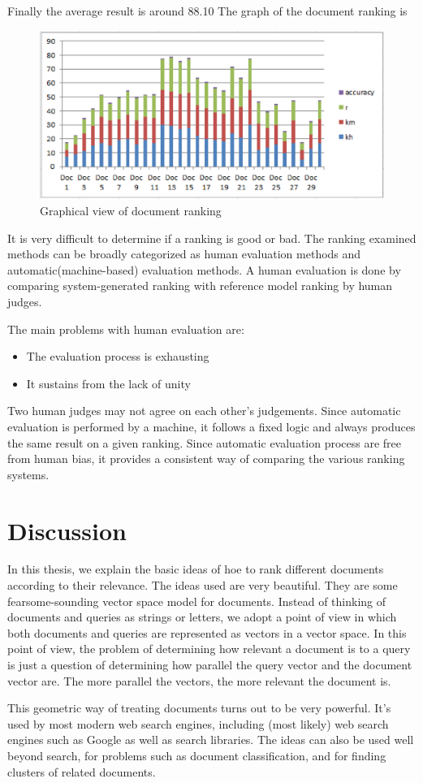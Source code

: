 Finally the average result is around 88.10%
The graph of the document ranking is


\begin{figure}[htp]
	\centering
		\includegraphics[width=.65\textwidth]{figure/six.eps}
	\caption{Graphical view of document ranking}
	\label{Figure:granking}
\end{figure}


It is very difficult to determine if a ranking is good or bad. The ranking examined methods can be broadly categorized as human evaluation methods and automatic(machine-based) evaluation methods. A human evaluation is done by comparing system-generated ranking with reference model ranking by human judges.

The main problems with human evaluation are:

\begin{itemize}
	\item The evaluation process is exhausting
	\item It sustains from the lack of unity
\end{itemize}

Two human judges may not agree on each other’s judgements. Since automatic evaluation is performed by a machine, it follows a fixed logic and always produces the same result on a given ranking. Since automatic evaluation process are free from human bias, it provides a consistent way of comparing the various ranking systems.


\section{Discussion}

In this thesis, we explain the basic ideas of hoe to rank different documents according to their relevance. The ideas used are very beautiful. They are some fearsome-sounding vector space model for documents. Instead of thinking of documents and queries as strings or letters, we adopt a point of view in which both documents and queries are represented as vectors in a vector space. In this point of view, the problem of determining how relevant a document is to a query is just a question of determining how parallel the query vector and the document vector are. The more parallel the vectors, the more relevant the document is.

This geometric way of treating documents turns out to be very powerful. It’s used by most modern web search engines, including (most likely) web search engines such as Google as well as search libraries. The ideas can also be used well beyond search, for problems such as document classification, and for finding clusters of related documents.


